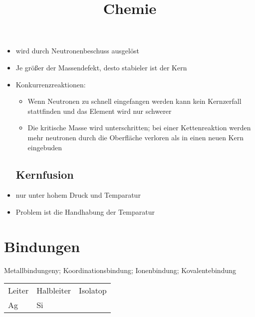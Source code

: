 \documentclass[a4paper,12pt]{scrartcl}
\begin{document}
\title{Chemie}
\maketitle

\begin{itemize}

\section{Physikalische Chemie} \label{Physikalische Chemie}

\subsection{Kernspaltung}

\item wird durch Neutronenbeschuss ausgelöst
\item Je größer der Massendefekt, desto stabieler ist der Kern
\item Konkurrenzreaktionen:

\begin{addmargin}[20mm]{0pt}
\begin{itemize}
\item Wenn Neutronen zu schnell eingefangen werden kann kein Kernzerfall stattfinden und das Element wird nur schwerer
\item Die kritische Masse wird unterschritten; bei einer Kettenreaktion werden mehr neutronen durch die Oberfläche verloren als in einen neuen Kern eingebuden
\end{itemize}
\end{addmargin}

\subsection{Kernfusion} \label{Kernfusion}
\item nur unter hohem Druck und Temparatur
\item Problem ist die Handhabung der Temparatur
\end{itemize}

\section{Bindungen}
Metallbindungeny; Koordinationsbindung; Ionenbindung; Kovalentebindung\\
\begin{tabular}{lll}
Leiter & Halbleiter & Isolatop\\
Ag & Si & 
\end{tabular}
\end{document}
